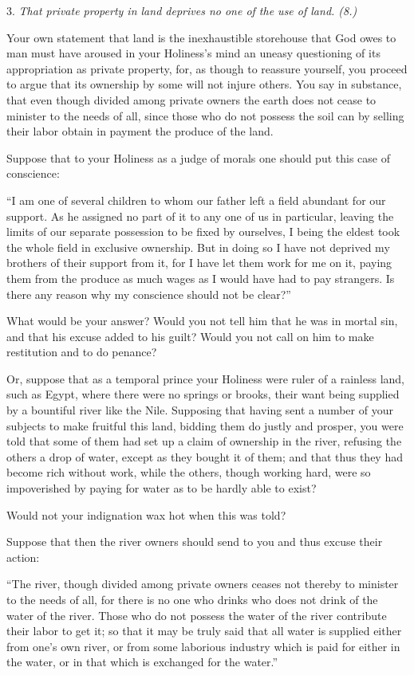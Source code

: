 \documentclass{book}
\begin{document}
3. \emph{That private property in land deprives no one of the use of land. (8.)}

Your own statement that land is the inexhaustible storehouse that God owes to man must have aroused in your Holiness’s mind an uneasy questioning of its appropriation as private property, for, as though to reassure yourself, you proceed to argue that its ownership by some will not injure others. You say in substance, that even though divided among private owners the earth does not cease to minister to the needs of all, since those who do not possess the soil can by selling their labor obtain in payment the produce of the land.

Suppose that to your Holiness as a judge of morals one should put this case of conscience:

“I am one of several children to whom our father left a field abundant for our support. As he assigned no part of it to any one of us in particular, leaving the limits of our separate possession to be fixed by ourselves, I being the eldest took the whole field in exclusive ownership. But in doing so I have not deprived my brothers of their support from it, for I have let them work for me on it, paying them from the produce as much wages as I would have had to pay strangers. Is there any reason why my conscience should not be clear?”

What would be your answer? Would you not tell him that he was in mortal sin, and that his excuse added to his guilt? Would you not call on him to make restitution and to do penance?

Or, suppose that as a temporal prince your Holiness were ruler of a rainless land, such as Egypt, where there were no springs or brooks, their want being supplied by a bountiful river like the Nile. Supposing that having sent a number of your subjects to make fruitful this land, bidding them do justly and prosper, you were told that some of them had set up a claim of ownership in the river, refusing the others a drop of water, except as they bought it of them; and that thus they had become rich without work, while the others, though working hard, were so impoverished by paying for water as to be hardly able to exist?

Would not your indignation wax hot when this was told?

Suppose that then the river owners should send to you and thus excuse their action:

“The river, though divided among private owners ceases not thereby to minister to the needs of all, for there is no one who drinks who does not drink of the water of the river. Those who do not possess the water of the river contribute their labor to get it; so that it may be truly said that all water is supplied either from one’s own river, or from some laborious industry which is paid for either in the water, or in that which is exchanged for the water.”
\end{document}

